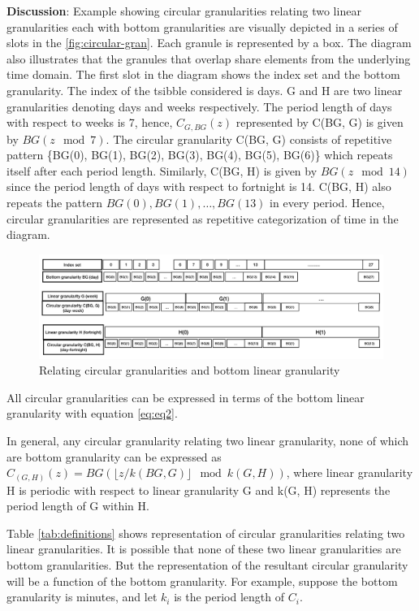 \documentclass[12pt]{article}
\begin{document}
\textbf{Discussion}: Example showing circular granularities relating two
linear granularities each with bottom granularities are visually
depicted in a series of slots in the \autoref{fig:circular-gran}. Each
granule is represented by a box. The diagram also illustrates that the
granules that overlap share elements from the underlying time domain.
The first slot in the diagram shows the index set and the bottom
granularity. The index of the tsibble considered is days. G and H are
two linear granularities denoting days and weeks respectively. The
period length of days with respect to weeks is 7, hence,
\(C_{G, BG}(z)\) represented by C(BG, G) is given by \(BG(z\mod 7)\).
The circular granularity C(BG, G) consists of repetitive pattern
\{BG(0), BG(1), BG(2), BG(3), BG(4), BG(5), BG(6)\} which repeats itself
after each period length. Similarly, C(BG, H) is given by
\(BG(z\mod 14)\) since the period length of days with respect to
fortnight is 14. C(BG, H) also repeats the pattern
\({BG(0), BG(1), \dots, BG(13)}\) in every period. Hence, circular
granularities are represented as repetitive categorization of time in
the diagram.

\begin{figure}

{\centering \includegraphics[width=1\linewidth]{Figs/circular-gran-diagram} 

}

\caption{Relating circular granularities and bottom linear granularity }\label{fig:circular-gran}
\end{figure}

All circular granularities can be expressed in terms of the bottom
linear granularity with equation \autoref{eq:eq2}.

In general, any circular granularity relating two linear granularity,
none of which are bottom granularity can be expressed as
\(C_{(G, H)}(z) = BG(\lfloor z/k(BG,G) \rfloor\mod k(G,H))\), where
linear granularity H is periodic with respect to linear granularity G
and k(G, H) represents the period length of G within H.

Table \ref{tab:definitions} shows representation of circular
granularities relating two linear granularities. It is possible that
none of these two linear granularities are bottom granularities. But the
representation of the resultant circular granularity will be a function
of the bottom granularity. For example, suppose the bottom granularity
is minutes, and let \(k_i\) is the period length of \(C_i\).
\end{document}
